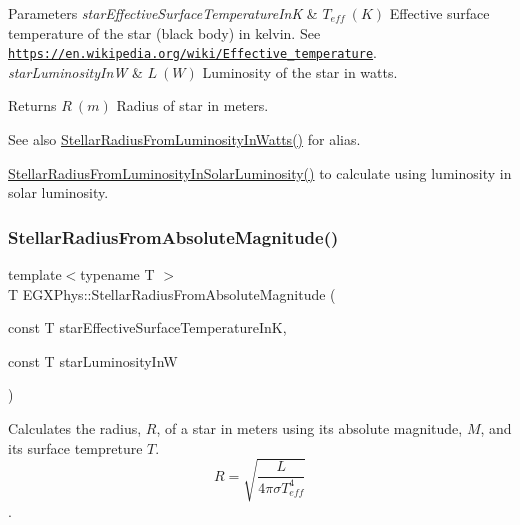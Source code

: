 \begin{DoxyParams}{Parameters}
{\em star\+Effective\+Surface\+Temperature\+InK} & $T_{eff}\ (K)$ Effective surface temperature of the star (black body) in kelvin. See \href{https://en.wikipedia.org/wiki/Effective_temperature}{\tt https\+://en.\+wikipedia.\+org/wiki/\+Effective\+\_\+temperature}. \\
\hline
{\em star\+Luminosity\+InW} & $L\ (W)$ Luminosity of the star in watts. \\
\hline
\end{DoxyParams}
\begin{DoxyReturn}{Returns}
$R\ (m)$ Radius of star in meters. 
\end{DoxyReturn}
\begin{DoxySeeAlso}{See also}
\mbox{\hyperlink{group___e_g_x_phys-_stellar_radius_ga59f0d5d89a857d30bff4c93713ee5bd9}{Stellar\+Radius\+From\+Luminosity\+In\+Watts()}} for alias. 

\mbox{\hyperlink{group___e_g_x_phys-_stellar_radius_ga49f0848777ba12cdfc78d112d82036ce}{Stellar\+Radius\+From\+Luminosity\+In\+Solar\+Luminosity()}} to calculate using luminosity in solar luminosity. 
\end{DoxySeeAlso}
\mbox{\label{group___e_g_x_phys-_stellar_radius_ga5c476c4ebcb0ad3e93a21393788d3dc2}} 
\subsubsection{\texorpdfstring{Stellar\+Radius\+From\+Absolute\+Magnitude()}{StellarRadiusFromAbsoluteMagnitude()}}
{\footnotesize\ttfamily template$<$typename T $>$ \\
T E\+G\+X\+Phys\+::\+Stellar\+Radius\+From\+Absolute\+Magnitude (\begin{DoxyParamCaption}\item[{const T}]{star\+Effective\+Surface\+Temperature\+InK,  }\item[{const T}]{star\+Luminosity\+InW }\end{DoxyParamCaption})}



Calculates the radius, $R$, of a star in meters using its absolute magnitude, $M$, and its surface tempreture $T$. \[R=\sqrt{\dfrac{L}{4\pi \sigma T_{eff}^4}}\]. 

